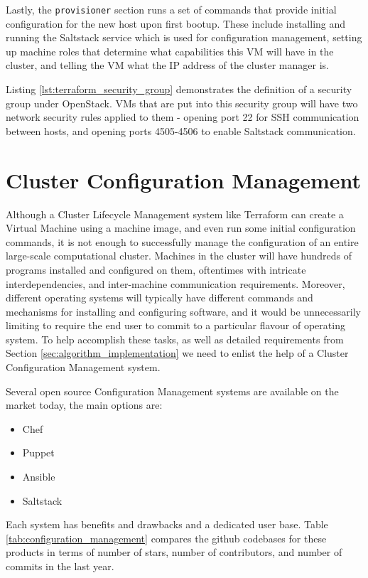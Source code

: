 Lastly, the \texttt{provisioner} section runs a set of commands that provide initial configuration for the new host upon first bootup. These include installing and running the Saltstack service which is used for configuration management, setting up machine roles  that determine what capabilities this VM will have in the cluster, and telling the VM what the IP address of the cluster manager is.

Listing \ref{lst:terraform_security_group} demonstrates the definition of a security group under OpenStack. VMs that are put into this security group will have two network security rules applied to them - opening port 22 for SSH communication between hosts, and opening ports 4505-4506 to enable Saltstack communication.

\section{Cluster Configuration Management}

Although a Cluster Lifecycle Management system like Terraform can create a Virtual Machine using a machine image, and even run some initial configuration commands, it is not enough to successfully manage the configuration of an entire large-scale computational cluster. Machines in the cluster will have hundreds of programs installed and configured on them, oftentimes with intricate interdependencies, and inter-machine communication requirements. Moreover, different operating systems will typically have different commands and mechanisms for installing and configuring software, and it would be unnecessarily limiting to require the end user to commit to a particular flavour of operating system. To help accomplish these tasks, as well as detailed requirements from Section \ref{sec:algorithm_implementation} we need to enlist the help of a Cluster Configuration Management system.

Several open source Configuration Management systems are available on the market today, the main options are:

\begin{itemize}
\item Chef
\item Puppet
\item Ansible
\item Saltstack
\end{itemize}

Each system has benefits and drawbacks and a dedicated user base. Table \ref{tab:configuration_management} compares the github codebases for these products in terms of number of stars, number of contributors, and number of commits in the last year. 

